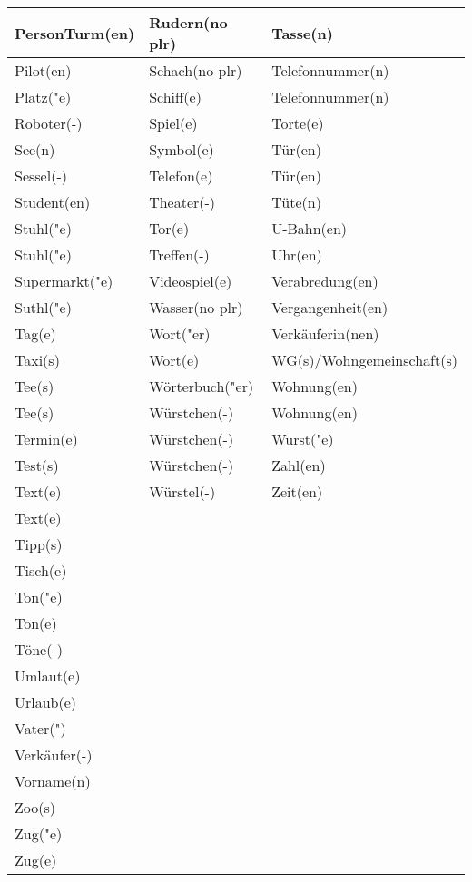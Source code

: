 \documentclass{article}
\begin{document}
\begin{table}[h!]
\begin{tabular}{|>{\raggedright\arraybackslash}p{5cm}|>{\raggedright\arraybackslash}p{5cm}|>{\raggedright\arraybackslash}p{5cm}|}
        PersonTurm(en) & Rudern(no plr) & Tasse(n) \\\hline
        Pilot(en) & Schach(no plr) & Telefonnummer(n) \\\hline
        Platz("e) & Schiff(e) & Telefonnummer(n) \\\hline
        Roboter(-) & Spiel(e) & Torte(e) \\\hline
        See(n) & Symbol(e) & Tür(en) \\\hline
        Sessel(-) & Telefon(e) & Tür(en) \\\hline
        Student(en) & Theater(-) & Tüte(n) \\\hline
        Stuhl("e) & Tor(e) & U-Bahn(en) \\\hline
        Stuhl("e) & Treffen(-) & Uhr(en) \\\hline
        Supermarkt("e) & Videospiel(e) & Verabredung(en) \\\hline
        Suthl("e) & Wasser(no plr) & Vergangenheit(en) \\\hline
        Tag(e) & Wort("er) & Verkäuferin(nen) \\\hline
        Taxi(s) & Wort(e) & WG(s)/Wohngemeinschaft(s) \\\hline
        Tee(s) & Wörterbuch("er) & Wohnung(en) \\\hline
        Tee(s) & Würstchen(-) & Wohnung(en) \\\hline
        Termin(e) & Würstchen(-) & Wurst("e) \\\hline
        Test(s) & Würstchen(-) & Zahl(en) \\\hline
        Text(e) & Würstel(-) & Zeit(en) \\\hline
        Text(e) &  &  \\\hline
        Tipp(s) &  &  \\\hline
        Tisch(e) &  &  \\\hline
        Ton("e) &  &  \\\hline
        Ton(e) &  &  \\\hline
        Töne(-) &  &  \\\hline
        Umlaut(e) &  &  \\\hline
        Urlaub(e) &  &  \\\hline
        Vater(") &  &  \\\hline
        Verkäufer(-) &  &  \\\hline
        Vorname(n) &  &  \\\hline
        Zoo(s) &  &  \\\hline
        Zug("e) &  &  \\\hline
        Zug(e) &  &  \\\hline
    \end{tabular}
\end{table}
\end{document}
